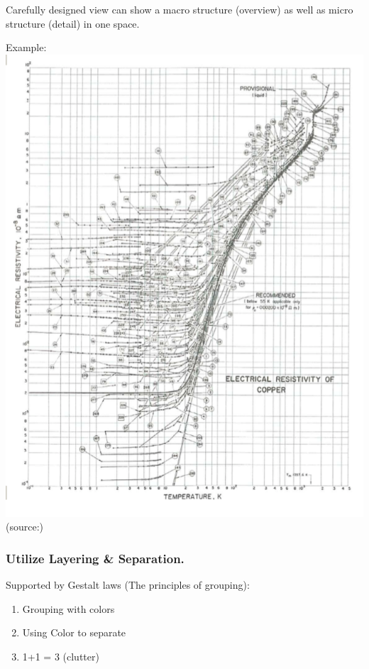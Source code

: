 \documentclass[]{book}
\providecommand{\tightlist}{%
  \setlength{\itemsep}{0pt}\setlength{\parskip}{0pt}}
\theoremstyle{definition}
\theoremstyle{definition}
\theoremstyle{definition}
\theoremstyle{remark}
\begin{document}
Carefully designed view can show a macro structure (overview) as well as
micro structure (detail) in one space.

Example: \includegraphics{images/Tufte_figure9.png}
(source:\citep{Tufte_2001})

\subsubsection{Utilize Layering \&
Separation.}\label{utilize-layering-separation.}

Supported by Gestalt laws (The principles of grouping):

\begin{enumerate}
\def\labelenumi{\arabic{enumi}.}
\tightlist
\item
  Grouping with colors
\item
  Using Color to separate
\item
  1+1 = 3 (clutter)
\end{enumerate}
\end{document}
